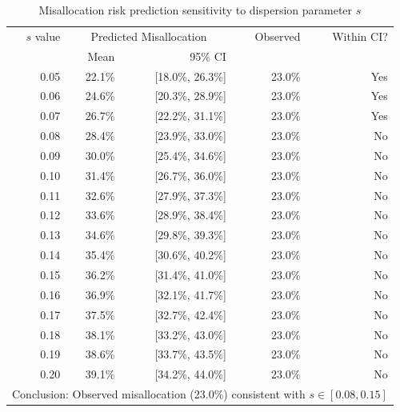 \begin{table}[htbp]
\caption{Misallocation risk prediction sensitivity to dispersion parameter $s$}
\label{tab:sensitivity_s}
\centering
\begin{tabular}{rrrrr}
\toprule
$s$ value & \multicolumn{2}{c}{Predicted Misallocation} & Observed & Within CI? \\
          & Mean & 95\% CI & & \\
\midrule
0.05 & 22.1\% & [18.0\%, 26.3\%] & 23.0\% & Yes \\
0.06 & 24.6\% & [20.3\%, 28.9\%] & 23.0\% & Yes \\
0.07 & 26.7\% & [22.2\%, 31.1\%] & 23.0\% & Yes \\
0.08 & 28.4\% & [23.9\%, 33.0\%] & 23.0\% & No \\
0.09 & 30.0\% & [25.4\%, 34.6\%] & 23.0\% & No \\
0.10 & 31.4\% & [26.7\%, 36.0\%] & 23.0\% & No \\
0.11 & 32.6\% & [27.9\%, 37.3\%] & 23.0\% & No \\
0.12 & 33.6\% & [28.9\%, 38.4\%] & 23.0\% & No \\
0.13 & 34.6\% & [29.8\%, 39.3\%] & 23.0\% & No \\
0.14 & 35.4\% & [30.6\%, 40.2\%] & 23.0\% & No \\
0.15 & 36.2\% & [31.4\%, 41.0\%] & 23.0\% & No \\
0.16 & 36.9\% & [32.1\%, 41.7\%] & 23.0\% & No \\
0.17 & 37.5\% & [32.7\%, 42.4\%] & 23.0\% & No \\
0.18 & 38.1\% & [33.2\%, 43.0\%] & 23.0\% & No \\
0.19 & 38.6\% & [33.7\%, 43.5\%] & 23.0\% & No \\
0.20 & 39.1\% & [34.2\%, 44.0\%] & 23.0\% & No \\
\bottomrule
\multicolumn{5}{l}{\footnotesize Conclusion: Observed misallocation (23.0\%) consistent with $s \in [0.08, 0.15]$}
\end{tabular}
\end{table}
